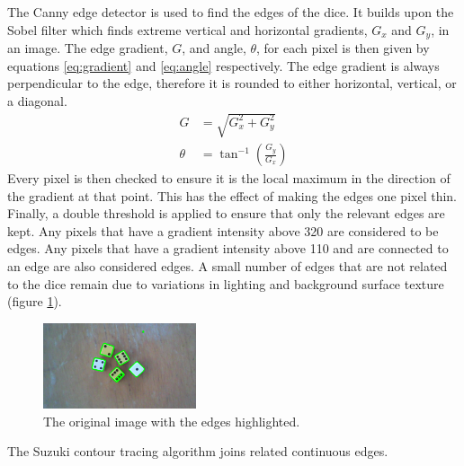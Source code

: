 \documentclass[conference]{IEEEtran}
\begin{document}
The Canny edge detector \cite{Canny1986} is used to find the edges of the dice.
It builds upon the Sobel filter \cite{Sobel2014} which finds extreme vertical and horizontal gradients, $G_x$ and $G_y$, in an image.
The edge gradient, $G$, and angle, $\theta$, for each pixel is then given by equations \ref{eq:gradient} and \ref{eq:angle} respectively.
The edge gradient is always perpendicular to the edge, therefore it is rounded to either horizontal, vertical, or a diagonal.
\begin{align}
	G &= \sqrt{G_x^2 + G_y^2} \label{eq:gradient} \\[1em]
	\theta &= \tan^{-1}\left(\frac{G_y}{G_x}\right) \label{eq:angle}
\end{align}
Every pixel is then checked to ensure it is the local maximum in the direction of the gradient at that point.
This has the effect of making the edges one pixel thin.
Finally, a double threshold is applied to ensure that only the relevant edges are kept.
Any pixels that have a gradient intensity above 320 are considered to be edges.
Any pixels that have a gradient intensity above 110 and are connected to an edge are also considered edges.
A small number of edges that are not related to the dice remain due to variations in lighting and background surface texture (figure \ref{fig:canny}).
\begin{figure}[H]
	\centering
	\includegraphics[width=0.4\textwidth]{canny}
	\caption{The original image with the edges highlighted.}
	\label{fig:canny}
\end{figure}

The Suzuki contour tracing algorithm \cite{Suzuki1985} joins related continuous edges.
\end{document}
